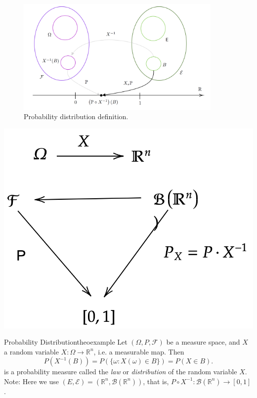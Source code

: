 \documentclass{tufte-handout}
\begin{document}
\begin{figure}
\centering
\includegraphics[width=10cm]{fig/pd.png}
\caption{Probability distribution definition.
}
\end{figure}
\begin{marginfigure}
\centering
\includegraphics{fig/diag2.png}

\caption{Probability distribution defined on the $n$-dimensional real space $\mathbb R$.
}
\end{marginfigure}

\begin{mydef}{Probability Distribution}{theoexample}
Let $(\Omega, P, \mathscr F)$ be a measure space, and  $X$  a random variable $X:\Omega \rightarrow \mathbb R^n $, i.e. a   measurable map. Then
\begin{equation*}
P(X^{-1}(B)) = P(\{\omega: X(\omega) \in B\}) = P(X \in B).
\end{equation*}
is a probability measure called the \textit{law} or \textit{distribution} of the random variable $X$. Note: Here we use $(E, \mathcal E) = (\mathbb R^n,\mathcal B(\mathbb R^n))$, that is, 
$P\circ X^{-1}: \mathcal B(\mathbb R^n)  \rightarrow [0,1]$.

\end{mydef}
\end{document}
